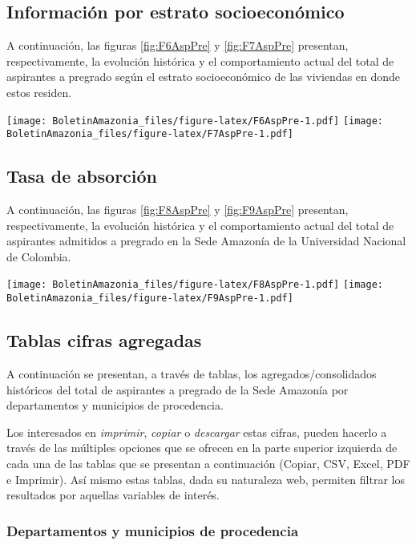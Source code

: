 \documentclass[
]{book}
\begin{document}
\hypertarget{informaciuxf3n-por-estrato-socioeconuxf3mico}{%
\subsection{Información por estrato socioeconómico}\label{informaciuxf3n-por-estrato-socioeconuxf3mico}}

A continuación, las figuras \ref{fig:F6AspPre} y \ref{fig:F7AspPre} presentan, respectivamente, la evolución histórica y el comportamiento actual del total de aspirantes a pregrado según el estrato socioeconómico de las viviendas en donde estos residen.

\texttt{[image: BoletinAmazonia\_files/figure-latex/F6AspPre-1.pdf]}
\texttt{[image: BoletinAmazonia\_files/figure-latex/F7AspPre-1.pdf]}

\hypertarget{tasa-de-absorciuxf3n}{%
\subsection{Tasa de absorción}\label{tasa-de-absorciuxf3n}}

A continuación, las figuras \ref{fig:F8AspPre} y \ref{fig:F9AspPre} presentan, respectivamente, la evolución histórica y el comportamiento actual del total de aspirantes admitidos a pregrado en la Sede Amazonía de la Universidad Nacional de Colombia.

\texttt{[image: BoletinAmazonia\_files/figure-latex/F8AspPre-1.pdf]}
\texttt{[image: BoletinAmazonia\_files/figure-latex/F9AspPre-1.pdf]}

\hypertarget{tablas-cifras-agregadas}{%
\subsection{Tablas cifras agregadas}\label{tablas-cifras-agregadas}}

A continuación se presentan, a través de tablas, los agregados/consolidados históricos del total de aspirantes a pregrado de la Sede Amazonía por departamentos y municipios de procedencia.

Los interesados en \emph{imprimir}, \emph{copiar} o \emph{descargar} estas cifras, pueden hacerlo a través de las múltiples opciones que se ofrecen en la parte superior izquierda de cada una de las tablas que se presentan a continuación (Copiar, CSV, Excel, PDF e Imprimir). Así mismo estas tablas, dada su naturaleza web, permiten filtrar los resultados por aquellas variables de interés.

\hypertarget{departamentos-y-municipios-de-procedencia}{%
\subsubsection{Departamentos y municipios de procedencia}\label{departamentos-y-municipios-de-procedencia}}
\end{document}
